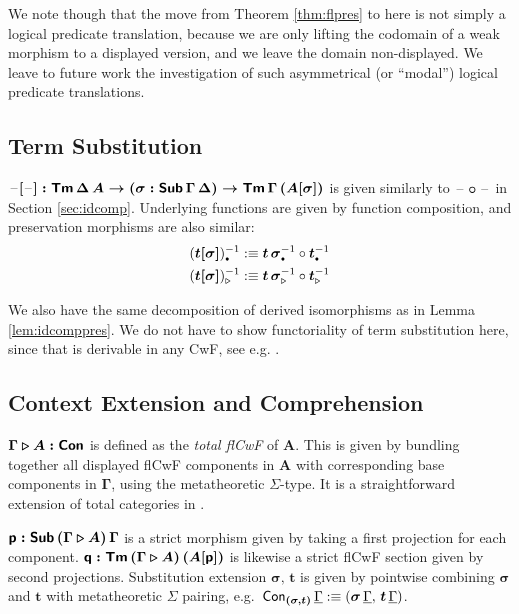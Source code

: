 \documentclass[sigplan,review,anonymous]{acmart}\settopmatter{printfolios=true,printccs=false,printacmref=false}
\newcommand{\ext}{\triangleright}
\newcommand{\emptycon}{\scaleobj{.75}\bullet}
\newcommand{\p}{\mathsf{p}}
\newcommand{\q}{\mathsf{q}}
\newcommand{\bGamma}{\boldsymbol{\Gamma}}
\newcommand{\bsigma}{\boldsymbol{\sigma}}
\newcommand{\bt}{\boldsymbol{t}}
\newcommand{\bA}{\boldsymbol{A}}
\newcommand{\ul}[1]{\underline{#1}}
\newcommand{\ulGamma}{\ul{\Gamma}}
\begin{document}
We note though that the move from Theorem \ref{thm:flpres} to here is not simply a
logical predicate translation, because we are only lifting the codomain of a
weak morphism to a displayed version, and we leave the domain non-displayed. We
leave to future work the investigation of such asymmetrical (or
``modal'') logical predicate translations.

\subsection{Term Substitution}

$\boldsymbol{\mathord{\hspace{1pt}\text{--}\hspace{1pt}}[\mathord{\hspace{1pt}\text{--}\hspace{1pt}}] : \mathsf{Tm}\,\Delta\,A \rightarrow (\sigma : \mathsf{Sub}\,\Gamma\,\Delta)
  \rightarrow \mathsf{Tm}\,\Gamma\,(A[\sigma])}$ is given similarly to
$\boldsymbol{\mathord{\hspace{1pt}\text{--}\hspace{1pt}}\circ\mathord{\hspace{1pt}\text{--}\hspace{1pt}}}$ in Section \ref{sec:idcomp}. Underlying functions
are given by function composition, and preservation morphisms are also similar:
\begin{alignat*}{3}
  & (\boldsymbol{t[\sigma]})_{\emptycon}^{-1} :\equiv
    \bt\,\bsigma_{\emptycon}^{-1} \circ \bt_{\emptycon}^{-1} \\
  & (\boldsymbol{t[\sigma]})_{\ext}^{-1} :\equiv
    \bt\,\bsigma_{\ext}^{-1} \circ \bt_{\ext}^{-1}
\end{alignat*}

We also have the same decomposition of derived isomorphisms as in Lemma
\ref{lem:idcomppres}. We do not have to show functoriality of term substitution
here, since that is derivable in any CwF, see e.g. \cite{kaposi2019constructing}.

\subsection{Context Extension and Comprehension}

$\boldsymbol{\Gamma \ext A : \Con}$ is defined as the \emph{total flCwF} of
$\bA$. This is given by bundling together all displayed flCwF components in
$\bA$ with corresponding base components in $\bGamma$, using the metatheoretic
$\Sigma$-type. It is a straightforward extension of total categories in
\cite{displayedcats}.

$\boldsymbol{\p : \Sub\,(\Gamma\ext A)\,\Gamma}$ is a strict morphism given by
taking a first projection for each component. $\boldsymbol{\q : \Tm\,(\Gamma\ext
  A)\,(A[\p])}$ is likewise a strict flCwF section given by second projections. Substitution extension $\boldsymbol{\sigma,\,t}$ is given by pointwise combining $\bsigma$ and $\bt$ with metatheoretic $\Sigma$ pairing, e.g.\ $\Con_{\boldsymbol{(\sigma,t)}}\,\ulGamma :\equiv (\bsigma\,\ulGamma,\,\bt\,\ulGamma)$.
\end{document}
